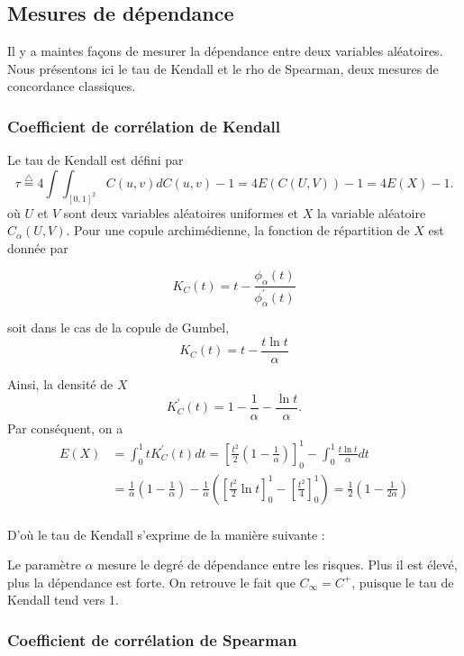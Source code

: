 \documentclass[11pt,a4paper]{article}
\begin{document}
\subsection{Mesures de d\'ependance}
Il y a maintes fa\c{c}ons de mesurer la d\'ependance entre deux variables al\'eatoires. Nous pr\'esentons ici le tau de Kendall
et le rho de Spearman, deux mesures de concordance classiques. 

\subsubsection{Coefficient de corr\'elation de Kendall}
Le tau de Kendall est d\'efini par
$$\tau \stackrel{\triangle}{=} 4\int\!\!\!\!\int_{[0,1]^2}C(u,v)dC(u,v)-1 = 4 E\left(C\left(U,V\right)\right)-1=4 E(X)-1.$$
o\`u $U$ et $V$ sont deux variables al\'eatoires uniformes et $X$ la variable al\'eatoire $C_\alpha(U,V)$.
Pour une copule archim\'edienne, la fonction de r\'epartition de $X$ est donn\'ee par

$$K_C(t)=t-\frac{\phi_\alpha(t)}{\phi_\alpha^\prime(t)}$$

soit dans le cas de la copule de Gumbel, 
$$K_C(t)=t-\frac{t\ln t}{\alpha}$$

Ainsi, la densit\'e de $X$ 
$$K_C^\prime(t)=1-\frac{1}{\alpha}-\frac{\ln t}{\alpha}.$$
Par cons\'equent, on a 
\begin{align*}
 E(X) &= \int^1_0tK_C^\prime(t)dt= \left[\frac{t^2}{2}\left(1-\frac{1}{\alpha}\right)\right]^1_0-\int^1_0\frac{t\ln t}{\alpha}dt \\
      &= \frac{1}{\alpha}\left(1-\frac{1}{\alpha}\right) - \frac{1}{\alpha}\left(\left[\frac{t^2}{2}\ln t\right]^1_0-\left[\frac{t^2}{4}\right]^1_0\right)
      =\frac{1}{2}\left(1-\frac{1}{2\alpha}\right)\\
\end{align*}

D'o\`u le tau de Kendall s'exprime de la mani\`ere suivante :
\begin{center}
\end{center}

\medskip

Le param\`etre $\alpha$ mesure le degr\'e de d\'ependance entre les risques. Plus il est \'elev\'e, plus la d\'ependance est forte. 
On retrouve le fait que $C_{\infty}=C^+$, puisque le tau de Kendall tend vers 1.



\subsubsection{Coefficient de corr\'elation de Spearman}
\end{document}
